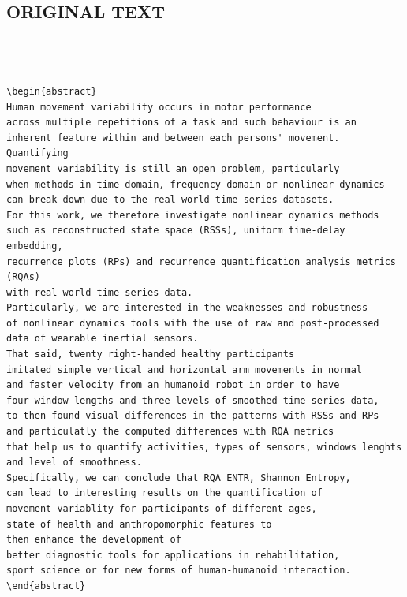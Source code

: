 \documentclass[10pt]{article}
\begin{document}
\subsection{ORIGINAL TEXT}
\begin{verbatim}



\begin{abstract}
Human movement variability occurs in motor performance 
across multiple repetitions of a task and such behaviour is an
inherent feature within and between each persons' movement. Quantifying
movement variability is still an open problem, particularly 
when methods in time domain, frequency domain or nonlinear dynamics 
can break down due to the real-world time-series datasets. 
For this work, we therefore investigate nonlinear dynamics methods 
such as reconstructed state space (RSSs), uniform time-delay embedding, 
recurrence plots (RPs) and recurrence quantification analysis metrics (RQAs)
with real-world time-series data.
Particularly, we are interested in the weaknesses and robustness 
of nonlinear dynamics tools with the use of raw and post-processed 
data of wearable inertial sensors. 
That said, twenty right-handed healthy participants 
imitated simple vertical and horizontal arm movements in normal 
and faster velocity from an humanoid robot in order to have 
four window lengths and three levels of smoothed time-series data,
to then found visual differences in the patterns with RSSs and RPs
and particulatly the computed differences with RQA metrics
that help us to quantify activities, types of sensors, windows lenghts 
and level of smoothness. 
Specifically, we can conclude that RQA ENTR, Shannon Entropy, 
can lead to interesting results on the quantification of 
movement variablity for participants of different ages, 
state of health and anthropomorphic features to 
then enhance the development of 
better diagnostic tools for applications in rehabilitation, 
sport science or for new forms of human-humanoid interaction.
\end{abstract}




\end{verbatim}
\end{document}
